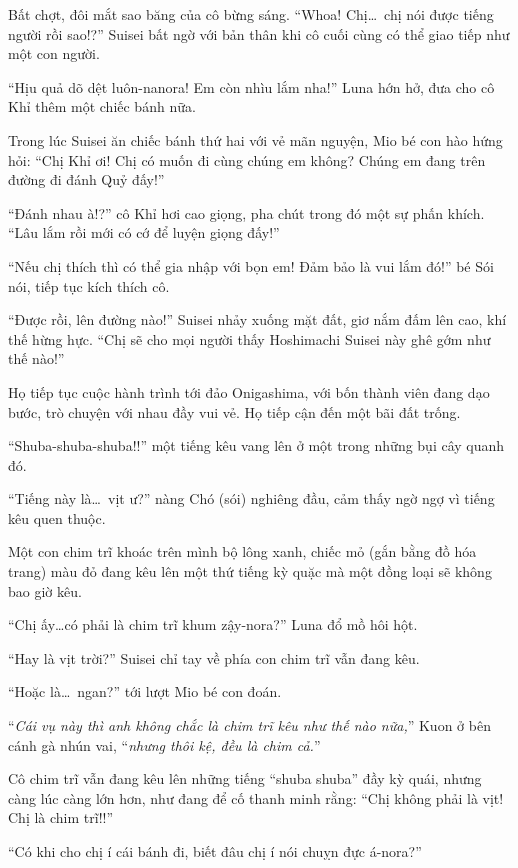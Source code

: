 \documentclass[../main.tex]{subfiles}
\begin{document}
Bất chợt, đôi mắt sao băng của cô bừng sáng. ``Whoa! Chị\dots\ chị nói được tiếng người rồi sao!?'' Suisei bất ngờ với bản thân khi cô cuối cùng có thể giao tiếp như một con người.

``Hịu quả dõ dệt luôn-nanora! Em còn nhìu lắm nha!'' Luna hớn hở, đưa cho cô Khỉ thêm một chiếc bánh nữa.

Trong lúc Suisei ăn chiếc bánh thứ hai với vẻ mãn nguyện, Mio bé con hào hứng hỏi: ``Chị Khỉ ơi! Chị có muốn đi cùng chúng em không? Chúng em đang trên đường đi đánh Quỷ đấy!''

``Đánh nhau à!?'' cô Khỉ hơi cao giọng, pha chút trong đó một sự phấn khích. ``Lâu lắm rồi mới có cớ để luyện giọng đấy!''

``Nếu chị thích thì có thể gia nhập với bọn em! Đảm bảo là vui lắm đó!'' bé Sói nói, tiếp tục kích thích cô.

``Được rồi, lên đường nào!'' Suisei nhảy xuống mặt đất, giơ nắm đấm lên cao, khí thế hừng hực. ``Chị sẽ cho mọi người thấy Hoshimachi Suisei này ghê gớm như thế nào!''

\ct

Họ tiếp tục cuộc hành trình tới đảo Onigashima, với bốn thành viên đang dạo bước, trò chuyện với nhau đầy vui vẻ. Họ tiếp cận đến một bãi đất trống.

``Shuba-shuba-shuba!!'' một tiếng kêu vang lên ở một trong những bụi cây quanh đó.

``Tiếng này là\dots\ vịt ư?'' nàng Chó (sói) nghiêng đầu, cảm thấy ngờ ngợ vì tiếng kêu quen thuộc.

Một con chim trĩ khoác trên mình bộ lông xanh, chiếc mỏ (gắn bằng đồ hóa trang) màu đỏ đang kêu lên một thứ tiếng kỳ quặc mà một đồng loại sẽ không bao giờ kêu.

``Chị ấy\dots có phải là chim trĩ khum zậy-nora?'' Luna đổ mồ hôi hột.

``Hay là vịt trời?'' Suisei chỉ tay về phía con chim trĩ vẫn đang kêu.

``Hoặc là\dots\ ngan?'' tới lượt Mio bé con đoán.

``\textit{Cái vụ này thì anh không chắc là chim trĩ kêu như thế nào nữa,}'' Kuon ở bên cánh gà nhún vai, ``\textit{nhưng thôi kệ, đều là chim cả.}''

Cô chim trĩ vẫn đang kêu lên những tiếng ``shuba shuba'' đầy kỳ quái, nhưng càng lúc càng lớn hơn, như đang để cố thanh minh rằng: ``Chị không phải là vịt! Chị là chim trĩ!!''

``Có khi cho chị í cái bánh đi, biết đâu chị í nói chuỵn đực á-nora?''
\end{document}
